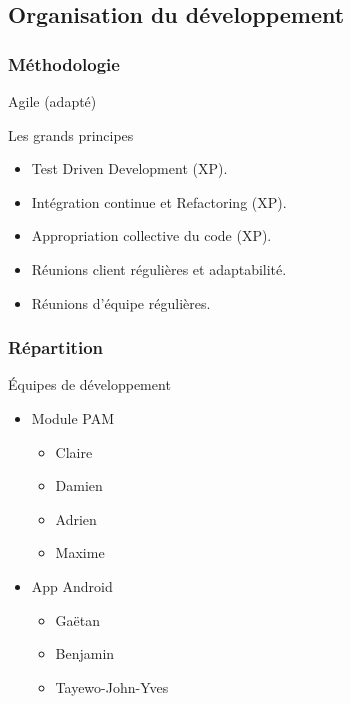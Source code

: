 \documentclass[xcolor=table]{beamer}
\begin{document}
\subsection{Organisation du développement}

\begin{frame}
\frametitle{Méthodologie}
\begin{center}
\Huge Agile (adapté)
\normalsize
\begin{block}{Les grands principes}
\begin{itemize}
 \item Test Driven Development (XP).
 \item Intégration continue et Refactoring (XP).
 \item Appropriation collective du code (XP).
 \item Réunions client régulières et adaptabilité.
 \item Réunions d'équipe régulières.
\end{itemize}
\end{block}
\end{center}

\end{frame}

\begin{frame}
\frametitle{Répartition}
\begin{block}{Équipes de développement}
  \begin{itemize}
    \item Module PAM
    \begin{itemize}
      \item Claire 
      \item Damien 
      \item Adrien 
      \item Maxime 
    \end{itemize}
    \item App Android
    \begin{itemize}
      \item Gaëtan 
      \item Benjamin 
      \item Tayewo-John-Yves 
    \end{itemize}
  \end{itemize}
\end{block}
\end{frame}
\end{document}
